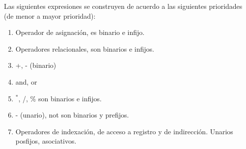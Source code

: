 \documentclass[11pt]{article}
\begin{document}
        Las siguientes expresiones se construyen de acuerdo a las siguientes prioridades (de menor a mayor prioridad):
        \begin{enumerate}
            \item Operador de asignación, es binario e infijo. 
            \item Operadores relacionales, son binarios e infijos.
            \item +, - (binario)
            \item and, or
            \item $^{\ast}$, /, \% son binarios e infijos.
            \item - (unario), not son binarios y prefijos.
            \item Operadores de indexación, de acceso a registro y de indirección. Unarios posfijos, asociativos.
        \end{enumerate}
\end{document}
